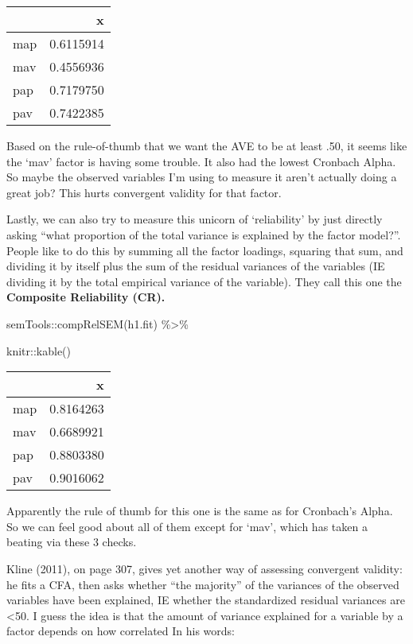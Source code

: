 \documentclass[
  letterpaper,
  DIV=11,
  numbers=noendperiod]{scrreprt}
\newenvironment{Shaded}{\begin{snugshade}}{\end{snugshade}}
\newcommand{\FunctionTok}[1]{\textcolor[rgb]{0.28,0.35,0.67}{#1}}
\newcommand{\NormalTok}[1]{\textcolor[rgb]{0.00,0.23,0.31}{#1}}
\newcommand{\SpecialCharTok}[1]{\textcolor[rgb]{0.37,0.37,0.37}{#1}}
\begin{document}
\begin{longtable}[]{@{}lr@{}}
\toprule()
& x \\
\midrule()
\endhead
map & 0.6115914 \\
mav & 0.4556936 \\
pap & 0.7179750 \\
pav & 0.7422385 \\
\bottomrule()
\end{longtable}

Based on the rule-of-thumb that we want the AVE to be at least .50, it
seems like the `mav' factor is having some trouble. It also had the
lowest Cronbach Alpha. So maybe the observed variables I'm using to
measure it aren't actually doing a great job? This hurts convergent
validity for that factor.

Lastly, we can also try to measure this unicorn of `reliability' by just
directly asking ``what proportion of the total variance is explained by
the factor model?''. People like to do this by summing all the factor
loadings, squaring that sum, and dividing it by itself plus the sum of
the residual variances of the variables (IE dividing it by the total
empirical variance of the variable). They call this one the
\textbf{Composite Reliability (CR).}

\begin{Shaded}
\begin{Highlighting}[]
\NormalTok{semTools}\SpecialCharTok{::}\FunctionTok{compRelSEM}\NormalTok{(h1.fit) }\SpecialCharTok{\%\textgreater{}\%} 
  
\NormalTok{  knitr}\SpecialCharTok{::}\FunctionTok{kable}\NormalTok{()}
\end{Highlighting}
\end{Shaded}

\begin{longtable}[]{@{}lr@{}}
\toprule()
& x \\
\midrule()
\endhead
map & 0.8164263 \\
mav & 0.6689921 \\
pap & 0.8803380 \\
pav & 0.9016062 \\
\bottomrule()
\end{longtable}

Apparently the rule of thumb for this one is the same as for Cronbach's
Alpha. So we can feel good about all of them except for `mav', which has
taken a beating via these 3 checks.

Kline (2011), on page 307, gives yet another way of assessing convergent
validity: he fits a CFA, then asks whether ``the majority'' of the
variances of the observed variables have been explained, IE whether the
standardized residual variances are \textless50. I guess the idea is
that the amount of variance explained for a variable by a factor depends
on how correlated In his words:
\end{document}
